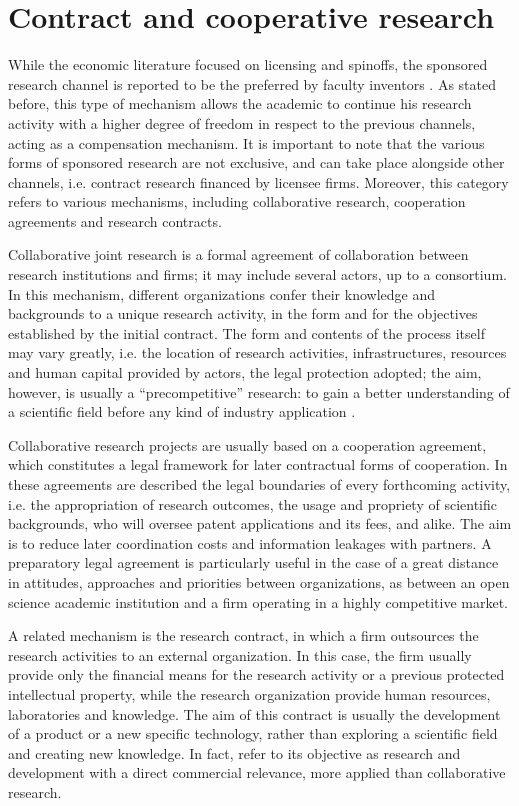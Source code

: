 \section{Contract and cooperative research}

While the economic literature focused on licensing and spinoffs, the sponsored research channel is reported to be the preferred by faculty inventors \citep{Jensen1998}. As stated before, this type of mechanism allows the academic to continue his research activity with a higher degree of freedom in respect to the previous channels, acting as a compensation mechanism. It is important to note that the various forms of sponsored research are not exclusive, and can take place alongside other channels, i.e. contract research financed by licensee firms. Moreover, this category refers to various mechanisms, including collaborative research, cooperation agreements and research contracts.

Collaborative joint research is a formal agreement of collaboration between research institutions and firms; it may include several actors, up to a consortium. In this mechanism, different organizations confer their knowledge and backgrounds to a unique research activity, in the form and for the objectives established by the initial contract. The form and contents of the process itself may vary greatly, i.e. the location of research activities, infrastructures, resources and human capital provided by actors, the legal protection adopted; the aim, however, is usually a \enquote{precompetitive} research: to gain a better understanding of a scientific field before any kind of industry application \citep{DEste2011}.

Collaborative research projects are usually based on a cooperation agreement, which constitutes a legal framework for later contractual forms of cooperation. In these agreements are described the legal boundaries of every forthcoming activity, i.e. the appropriation of research outcomes, the usage and propriety of scientific backgrounds, who will oversee patent applications and its fees, and alike. The aim is to reduce later coordination costs and information leakages with partners. A preparatory legal agreement is particularly useful in the case of a great distance in attitudes, approaches and priorities between organizations, as between an open science academic institution and a firm operating in a highly competitive market. 

A related mechanism is the research contract, in which a firm outsources the research activities to an external organization. In this case, the firm usually provide only the financial means for the research activity or a previous protected intellectual property, while the research organization provide human resources, laboratories and knowledge. The aim of this contract is usually the development of a product or a new specific technology, rather than exploring a scientific field and creating new knowledge. In fact, \citet{DEste2011} refer to its objective as research and development with a direct commercial relevance, more applied than collaborative research.

